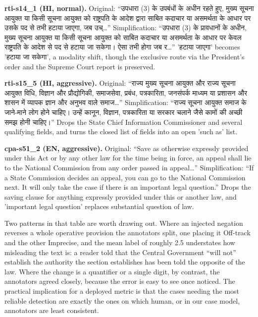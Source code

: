 \documentclass[conference]{IEEEtran}
\newcommand{\dev}[1]{{\devfont #1}}
\begin{document}
{\noindent\textbf{rti-s14\_1 (HI, normal).} Original: ``\dev{उपधारा (3) के उपबंधों के अधीन रहते हुए, मुख्य सूचना आयुक्त या किसी सूचना आयुक्त को राष्ट्रपति के आदेश द्वारा साबित कदाचार या असमर्थता के आधार पर उसके पद से तभी हटाया जाएगा, जब उच्}…'' Simplification: ``\dev{उपधारा (3) के प्रावधानों के अधीन, मुख्य सूचना आयुक्त या किसी सूचना आयुक्त को साबित कदाचार या असमर्थता के आधार पर केवल राष्ट्रपति के आदेश से पद से हटाया जा सकेगा। ऐसा तभी होगा जब र}…'' '\dev{हटाया जाएगा}' becomes '\dev{हटाया जा सकेगा}', a modality shift, though the exclusive route via the President's order and the Supreme Court report is preserved.

\noindent\textbf{rti-s15\_5 (HI, aggressive).} Original: ``\dev{राज्य मुख्य सूचना आयुक्त और राज्य सूचना आयुक्त विधि, विज्ञान और प्रौद्योगिकी, समाजसेवा, प्रबंध, पत्रकारिता, जनसंपर्क माध्यम या प्रशासन और शासन में व्यापक ज्ञान और अनुभव वाले समाज}…'' Simplification: ``\dev{राज्य सूचना आयुक्त समाज के जाने-माने लोग होने चाहिए। उन्हें कानून, विज्ञान, पत्रकारिता या सरकार चलाने जैसे कामों की अच्छी समझ होनी चाहिए।}'' Drops the State Chief Information Commissioner and several qualifying fields, and turns the closed list of fields into an open 'such as' list.

\noindent\textbf{cpa-s51\_2 (EN, aggressive).} Original: ``Save as otherwise expressly provided under this Act or by any other law for the time being in force, an appeal shall lie to the National Commission from any order passed in appeal…'' Simplification: ``If a State Commission decides an appeal, you can go to the National Commission next. It will only take the case if there is an important legal question.'' Drops the saving clause for anything expressly provided under this or another law, and 'important legal question' replaces substantial question of law.

}
Two patterns in that table are worth drawing out. Where an injected negation reverses a whole operative provision the annotators split, one placing it Off-track and the other Imprecise, and the mean label of roughly 2.5 understates how misleading the text is: a reader told that the Central Government “will not” establish the authority the section establishes has been told the opposite of the law. Where the change is a quantifier or a single digit, by contrast, the annotators agreed closely, because the error is easy to see once noticed. The practical implication for a deployed metric is that the cases needing the most reliable detection are exactly the ones on which human, or in our case model, annotators are least consistent.
\end{document}
